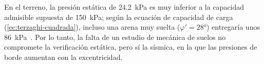 En el terreno, la presión estática de \qty{24.2}{\kilo\pascal} es muy inferior a la capacidad admisible supuesta de \qty{150}{\kilo\pascal}; según la ecuación de capacidad de carga (\cref{ec:terzaghi-cuadrada}), incluso una arena muy suelta ($\varphi' = \ang{28}$) entregaría unos \qty{86}{\kilo\pascal}~\parencite{das2015fundamentos}.
Por lo tanto, la falta de un estudio de mecánica de suelos no compromete la verificación estática, pero sí la sísmica, en la que las presiones de borde aumentan con la excentricidad.
